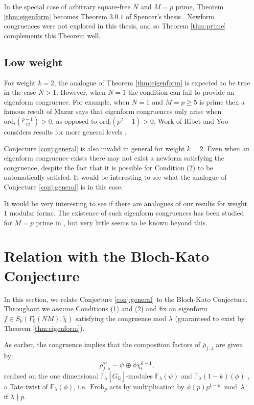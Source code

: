 \documentclass{amsart}
\theoremstyle{plain}
\theoremstyle{definition}
\begin{document}
In the special case of arbitrary square-free $N$ and $M=p$ prime, Theorem \ref{thm:eigenform} becomes Theorem $3.0.1$ of Spencer's thesis \cite{spencer_2018}. Newform congruences were not explored in this thesis, and so Theorem \ref{thm:prime} complements this Theorem well.

\subsection{Low weight}

For weight $k=2$, the analogue of Theorem \ref{thm:eigenform} is expected to be true in the case $N> 1$. However, when $N=1$ the condition can fail to provide an eigenform congruence. For example, when $N=1$ and $M = p\geq 5$ is prime then a famous result of Mazur \cite{mazur} says that eigenform congruences only arise when $\text{ord}_{l}\left(\frac{p-1}{12}\right)>0$, as opposed to $\text{ord}_{l}(p^2-1)>0$. Work of Ribet and Yoo considers results for more general levels \cite{ribetyoo}.

Conjecture \ref{conj:general} is also invalid in general for weight $k=2$. Even when an eigenform congruence exists there may not exist a newform satisfying the congruence, despite the fact that it is possible for Condition (2) to be automatically satisfed. It would be interesting to see what the analogue of Conjecture \ref{conj:general} is in this case.

It would be very interesting to see if there are analogues of our results for weight $1$ modular forms. The existence of such eigenform congruences has been studied for $M=p$ prime in \cite{spencer_2018}, but very little seems to be known beyond this.

\section{Relation with the Bloch-Kato Conjecture}
\label{section:BK}
In this section, we relate Conjecture \ref{conj:general} to the Bloch-Kato Conjecture. Throughout we assume Conditions (1) and (2) and fix an eigenform $f\in S_k(\Gamma_0(NM), \tilde{\chi})$ satisfying the congruence mod $\lambda$ (guaranteed to exist by Theorem \ref{thm:eigenform}).

As earlier, the congruence implies that the composition factors of $\overline{\rho}_{f,\lambda}$ are given by: \[\overline{\rho}_{f,\lambda}^{\text{ss}} \sim \overline{\psi}\oplus\overline{\phi}\chi_l^{k-1},\] realised on the one dimensional $\mathbb{F}_\lambda[G_{\mathbb{Q}}]$-modules $\mathbb{F}_\lambda(\psi)$ and $\mathbb{F}_\lambda (1-k)(\phi)$ , a Tate twist of $\mathbb{F}_{\lambda}(\phi)$, i.e.\ $\text{Frob}_p$ acts by multiplication by $\phi(p)p^{1-k} \bmod \lambda$ if $\lambda\nmid p$. 
\end{document}
